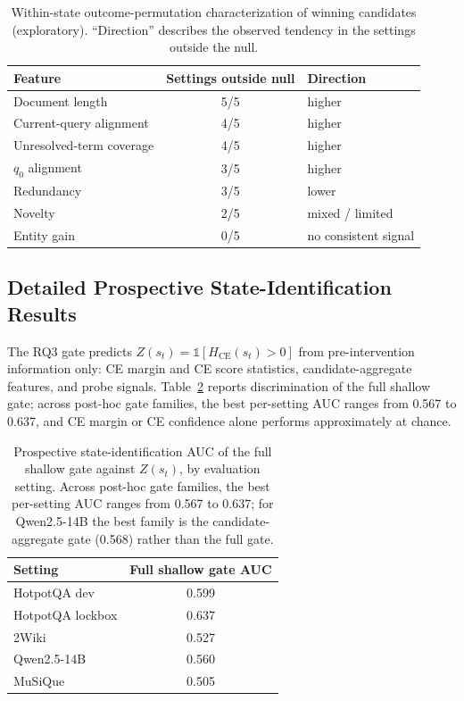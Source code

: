 \documentclass[10pt]{article}
\begin{document}
\begin{table}[h]
\centering
\small
\caption{Within-state outcome-permutation characterization of winning
candidates (exploratory). ``Direction'' describes the observed tendency in
the settings outside the null.}
\label{tab:permnull}
\begin{tabular}{lcl}
\toprule
\textbf{Feature} & \textbf{Settings outside null} & \textbf{Direction} \\
\midrule
Document length            & 5/5 & higher \\
Current-query alignment    & 4/5 & higher \\
Unresolved-term coverage   & 4/5 & higher \\
$q_0$ alignment            & 3/5 & higher \\
Redundancy                 & 3/5 & lower \\
Novelty                    & 2/5 & mixed / limited \\
Entity gain                & 0/5 & no consistent signal \\
\bottomrule
\end{tabular}
\end{table}

\subsection{Detailed Prospective State-Identification Results}
\label{sec:gatedetail}

The RQ3 gate predicts $Z(s_t)=\mathbb{1}[H_{\mathrm{CE}}(s_t)>0]$ from
pre-intervention information only: CE margin and CE score statistics,
candidate-aggregate features, and probe signals. Table~\ref{tab:gateauc}
reports discrimination of the full shallow gate; across post-hoc gate
families, the best per-setting AUC ranges from 0.567 to 0.637, and CE margin
or CE confidence alone performs approximately at chance.

\begin{table}[h]
\centering
\small
\caption{Prospective state-identification AUC of the full shallow gate
against $Z(s_t)$, by evaluation setting. Across post-hoc gate families, the
best per-setting AUC ranges from 0.567 to 0.637; for Qwen2.5-14B the best
family is the candidate-aggregate gate (0.568) rather than the full gate.}
\label{tab:gateauc}
\begin{tabular}{lc}
\toprule
\textbf{Setting} & \textbf{Full shallow gate AUC} \\
\midrule
HotpotQA dev     & 0.599 \\
HotpotQA lockbox & 0.637 \\
2Wiki            & 0.527 \\
Qwen2.5-14B      & 0.560 \\
MuSiQue          & 0.505 \\
\bottomrule
\end{tabular}
\end{table}
\end{document}
